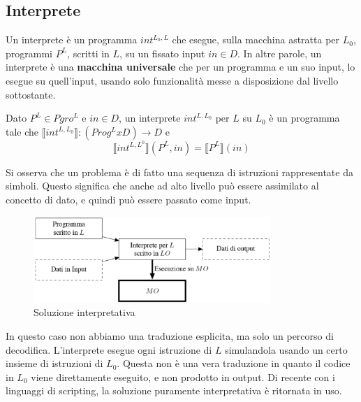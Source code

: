 \documentclass[oneside,a4paper,11pt]{book}
\theoremstyle{italicstyle}
\theoremstyle{normStyle}
\begin{document}
\subsection{Interprete}
Un interprete è un programma $int^{L_0,L}$ che esegue, sulla macchina astratta per $L_0$,
programmi $P^L$, scritti in $L$, su un fissato input $in\in D$. In 
altre parole, un interprete è una \textbf{macchina universale} che 
per un programma e un suo input, lo esegue su quell'input, usando solo funzionalità 
messe a disposizione dal livello sottostante.
\begin{tcolorbox}[title={Interprete da $L$ a $L_0$}]
Dato $P^L \in Pgro^L$ e $in \in D$, un interprete $int^{L,L_0}$ per 
$L$ su $L_0$ è un programma tale che 
$\llbracket int^{L,L_0}\rrbracket:(Prog^L x D)\rightarrow D$ e 
\[
\llbracket int^{L,L^0} \rrbracket (P^L, in) = \llbracket P^L\rrbracket(in)
\]
\end{tcolorbox}
Si osserva che un problema è di fatto una sequenza di istruzioni 
rappresentate da simboli. Questo significa che anche ad alto livello 
può essere assimilato al concetto di dato, e quindi può essere passato come input.
\begin{figure}[H]
  \centering
  \includegraphics[width=9cm]{img/interprete.jpeg}
  \caption{Soluzione interpretativa}
  \label{fig:int}
\end{figure}
In questo caso non abbiamo una traduzione esplicita, ma solo un percorso 
di decodifica. L'interprete esegue ogni istruzione di $L$ simulandola usando 
un certo insieme di istruzioni di $L_0$. Questa non è una vera traduzione 
in quanto il codice in $L_0$ viene direttamente eseguito, e non 
prodotto in output. Di recente con i linguaggi di scripting, la 
soluzione puramente interpretativa è ritornata in uso.
\end{document}

